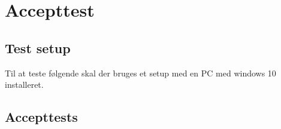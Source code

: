 
\chapter{Accepttest}


\section{Test setup}
Til at teste følgende skal der bruges et setup med en PC med windows 10 installeret. 
  
\section{Accepttests}














